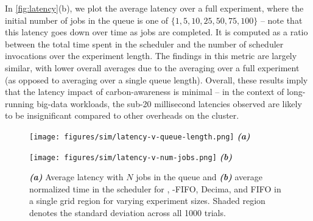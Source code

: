 In \autoref{fig:latency}(b), we plot the average latency over a full experiment, where the initial number of jobs in the queue is one of $\{1, 5, 10, 25, 50, 75, 100\}$ -- note that this latency goes down over time as jobs are completed.  It is computed as a ratio between the total time spent in the scheduler and the number of scheduler invocations over the experiment length.  The findings in this metric are largely similar, with lower overall averages due to the averaging over a full experiment (as opposed to averaging over a single queue length).
Overall, these results imply that the latency impact of carbon-awareness is minimal -- in the context of long-running big-data workloads, the sub-20 millisecond latencies observed are likely to be insignificant compared to other overheads on the cluster.

\begin{figure*}[h]
\hfill 
\begin{minipage}{0.32\linewidth}
        \centering
    \texttt{[image: figures/sim/latency-v-queue-length.png]} \vspace{-1em}
    {\centering \textbf{\textit{(a)}}}
\end{minipage} \hfill
\begin{minipage}{0.32\linewidth}
        \centering
    \texttt{[image: figures/sim/latency-v-num-jobs.png]} \vspace{-1em}
    {\centering \textbf{\textit{(b)}}}
\end{minipage} 
\hfill \hfill
\caption{  \textbf{\textit{(a)}} Average latency with $N$ jobs in the queue and \textbf{\textit{(b)}} average normalized time  in the scheduler for \PCAPS, \CAP-FIFO, Decima, and FIFO in a single grid region for varying experiment sizes.  Shaded region denotes the standard deviation across all 1000 trials. } \label{fig:latency}
\end{figure*}




